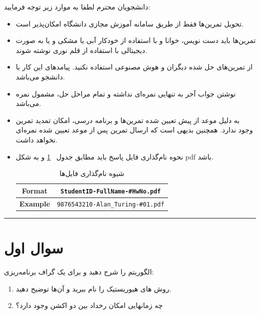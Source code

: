 \documentclass[a4paper,10pt]{article}
\begin{document}
دانشجویان محترم لطفا به موارد زیر توجه فرمایید:
\begin{itemize}
\itemsep0em
\item
	تحويل تمرين‌ها فقط از طريق سامانه  آموزش مجازی دانشگاه امکان‌‌پذیر است.
\item 
	تمرین‌ها باید دست نویس، خوانا و با استفاده از خودکار آبی یا مشکی و یا به صورت دیجیتالی با استفاده از قلم نوری نوشته شوند. 
\item
از تمرین‌های حل شده دیگران و هوش مصنوعی استفاده نکنید. پیامد‌های این کار با دانشجو می‌باشد. 
\item
	نوشتن جواب آخر به تنهايى نمره‌ای نداشته و تمام مراحل حل، مشمول نمره می‌باشد.
\item 
	به دلیل موعد از پیش تعیین شده تمرین‌ها و برنامه درسی، امکان تمدید تمرین وجود ندارد. همچنین بدیهی است که ارسال تمرین پس از موعد تعیین شده نمره‌ای نخواهد داشت.
	
\item نحوه نام‌گذاری فایل پاسخ باید مطابق جدول ~\ref{tab:file_format}
و به شکل pdf باشد.

\begin{table}[h]
	\centering
	\begin{tabular}{|c|c|}
		\hline
		\textbf{Format} & \texttt{StudentID-FullName-\#HwNo.pdf} \\
		\hline
		\textbf{Example} & \texttt{9876543210-Alan\_Turing-\#01.pdf} \\
		\hline
	\end{tabular}
	\caption{شیوه نام‌گذاری فایل‌ها}
	\label{tab:file_format}
\end{table}
    
    
\end{itemize}
\rule{\linewidth}{0.4pt}


\section{سوال اول}

 الگوریتم  را شرح دهید و برای یک گراف برنامه‌ریزی:

\begin{enumerate}
  \item[الف)]  روش های هیوریستیک را نام ببرید و آن‌ها توضیح دهید.
  \item[ب)] چه زمانهایی امکان رخداد  بین دو اکشن وجود دارد؟
\end{enumerate}
\end{document}
